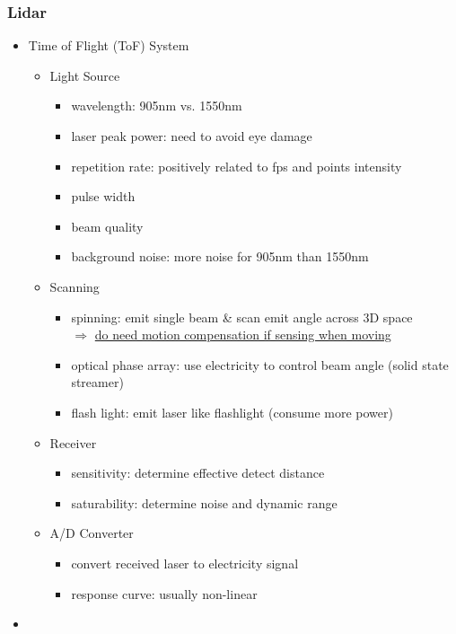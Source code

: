 \subsubsection{Lidar}
\begin{itemize}
\item Time of Flight (ToF) System
	\begin{itemize}
	\item Light Source
		\begin{itemize}
		\item wavelength: 905nm vs. 1550nm
		\item laser peak power: need to avoid eye damage
		\item repetition rate: positively related to fps and points intensity
		\item pulse width
		\item beam quality
		\item background noise: more noise for 905nm than 1550nm
		\end{itemize}
	\item Scanning
		\begin{itemize}
		\item spinning: emit single beam \& scan emit angle across 3D space \\
		$\Rightarrow$ \underline{do need motion compensation if sensing when moving}
		\item optical phase array: use electricity to control beam angle (solid state streamer)
		\item flash light: emit laser like flashlight (consume more power)
		\end{itemize}
	\item Receiver
		\begin{itemize}
		\item sensitivity: determine effective detect distance
		\item saturability: determine noise and dynamic range
		\end{itemize}
	\item A/D Converter
		\begin{itemize}
		\item convert received laser to electricity signal
		\item response curve: usually non-linear
		\end{itemize}
	\end{itemize}
\item 
\end{itemize}
